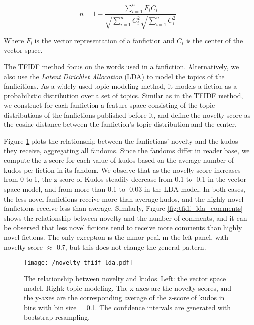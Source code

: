 \documentclass[a4paper]{article}
\begin{document}
\begin{equation}
n = 1-\frac{\sum_{i=1}^{n}{F_iC_i}}{\sqrt{\sum_{i=1}^{n}{C_i^2}}\sqrt{\sum_{i=1}^{n}{C_i^2}}}
\end{equation}

Where $F_i$ is the vector representation of a fanfiction and $C_i$ is the center of the vector space.

The TFIDF method focus on the words used in a fanfiction. Alternatively, we also use the \emph{Latent Dirichlet Allocation} (LDA) \cite{blei2003latent} to model the topics of the fanficitions. As a widely used topic modeling method, it models a fiction as a probabilistic distribution over a set of topics. Similar as in the TFIDF method, we construct for each fanfiction a feature space consisting of the topic distributions of the fanfictions published before it, and define the novelty score as the cosine distance between the fanfiction's topic distribution and the center. 

Figure \ref{fig:tfidf_lda_kudos} plots the relationship between the fanfictions' novelty and the kudos they receive, aggregating all fandoms. Since the fandoms differ in reader base, we compute the z-score for each value of kudos based on the average number of kudos per fiction in its fandom. We observe that as the novelty score increases from 0  to 1, the z-score of Kudos steadily decrease from 0.1 to -0.1 in the vector space model, and from more than 0.1 to -0.03 in the LDA model. In both cases, the less novel fanfictions receive more than average kudos, and the highly novel fanfictions receive less than average. Similarly, Figure \ref{fig:tfidf_lda_comments} shows the relationship between novelty and the number of comments, and it can be observed that less novel fictions tend to receive more comments than highly novel fictions. The only exception is the minor peak in the left panel, with novelty score $\approx$ 0.7, but this does not change the general pattern.


\begin{figure}
    \centering
          \texttt{[image: /novelty\_tfidf\_lda.pdf]}
        \caption{The relationship between novelty and kudos. Left: the vector space model. Right: topic modeling. The x-axes are the novelty scores, and the y-axes are the corresponding average of the z-score of kudos in bins with bin size = 0.1. The confidence intervals are generated with bootstrap resampling. }
        \label{fig:tfidf_lda_kudos}
\end{figure}
\end{document}
